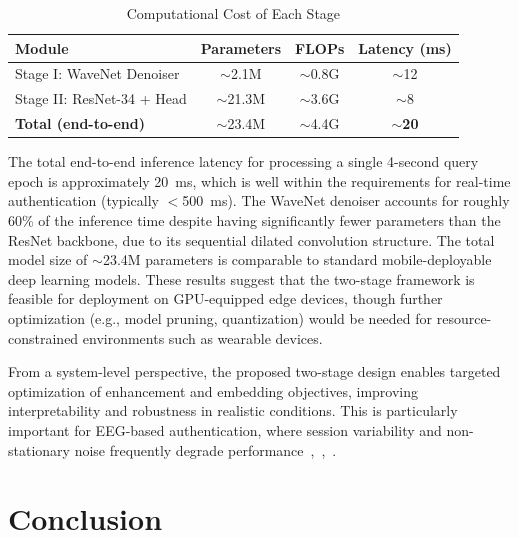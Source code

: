 \documentclass[conference]{IEEEtran}
\begin{document}
\begin{table}[htbp]
\caption{Computational Cost of Each Stage}
\label{tab:compute}
\begin{center}
\begin{tabular}{lccc}
\toprule
\textbf{Module} & \textbf{Parameters} & \textbf{FLOPs} & \textbf{Latency (ms)} \\
\midrule
Stage I: WaveNet Denoiser & $\sim$2.1M  & $\sim$0.8G  & $\sim$12 \\
Stage II: ResNet-34 + Head & $\sim$21.3M & $\sim$3.6G  & $\sim$8  \\
\midrule
\textbf{Total (end-to-end)} & $\sim$23.4M & $\sim$4.4G & $\sim$\textbf{20} \\
\bottomrule
\end{tabular}
\end{center}
\end{table}

The total end-to-end inference latency for processing a single 4-second query epoch is approximately 20~ms, which is well within the requirements for real-time authentication (typically $<$500~ms). The WaveNet denoiser accounts for roughly 60\% of the inference time despite having significantly fewer parameters than the ResNet backbone, due to its sequential dilated convolution structure. The total model size of $\sim$23.4M parameters is comparable to standard mobile-deployable deep learning models. These results suggest that the two-stage framework is feasible for deployment on GPU-equipped edge devices, though further optimization (e.g., model pruning, quantization) would be needed for resource-constrained environments such as wearable devices.

From a system-level perspective, the proposed two-stage design enables targeted optimization of enhancement and embedding objectives, improving interpretability and robustness in realistic conditions. This is particularly important for EEG-based authentication, where session variability and non-stationary noise frequently degrade performance~\cite{b1},~\cite{b2},~\cite{b4}.

\section{Conclusion}
\end{document}
